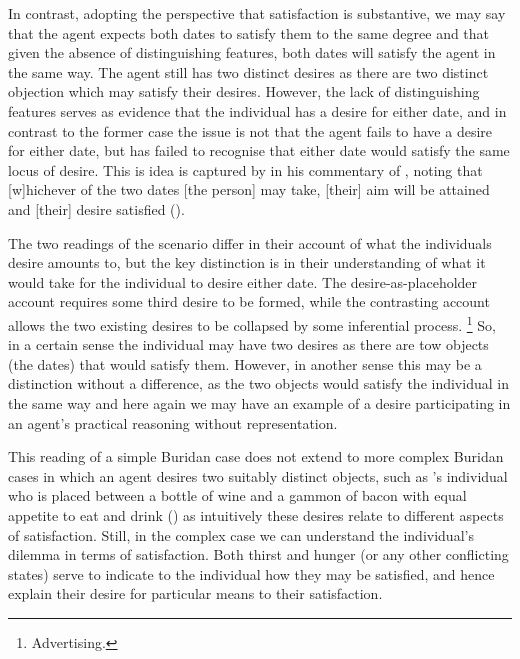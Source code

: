\documentclass[10pt]{article}
\begin{document}
In contrast, adopting the perspective that satisfaction is substantive, we may say that the agent expects both dates to satisfy them to the same degree and that  given the absence of distinguishing features, both dates will satisfy the agent in the same way.
The agent still has two distinct desires as there are two distinct objection which may satisfy their desires.
However, the lack of distinguishing features serves as evidence that the individual has a desire for either date, and in contrast to the former case the issue is not that the agent fails to have a desire for either date, but has failed to recognise that either date would satisfy the same locus of desire.
This is idea is captured by \citeauthor{Averroes:1954aa} in his commentary of \citeauthor{Al-Ghazali:1963aa}, noting that [w]hichever of the two dates [the person] may take, [their] aim will be attained and [their] desire satisfied (\citeyear[23]{Averroes:1954aa}).

The two readings of the scenario differ in their account of what the individuals desire amounts to, but the key distinction is in their understanding of what it would take for the individual to desire either date.
The desire-as-placeholder account requires some third desire to be formed, while the contrasting account allows the two existing desires to be collapsed by some inferential process.\nolinebreak
\footnote{\color{red} Advertising.}
So, in a certain sense the individual may have two desires as there are tow objects (the dates) that would satisfy them.
However, in another sense this may be a distinction without a difference, as the two objects would satisfy the individual in the same way and here again we may have an example of a desire participating in an agent's practical reasoning without representation.

This reading of a simple Buridan case does not extend to more complex Buridan cases in which an agent desires two suitably distinct objects, such as \citeauthor{Montaigne:1965aa}'s individual who is placed between a bottle of wine and a gammon of bacon with equal appetite to eat and drink (\cite[cf.][156]{Rescher:1960aa}) as intuitively these desires relate to different aspects of satisfaction.
Still, in the complex case we can understand the individual's dilemma in terms of satisfaction.
Both thirst and hunger (or any other conflicting states) serve to indicate to the individual how they may be satisfied, and hence explain their desire for particular means to their satisfaction.
\end{document}
